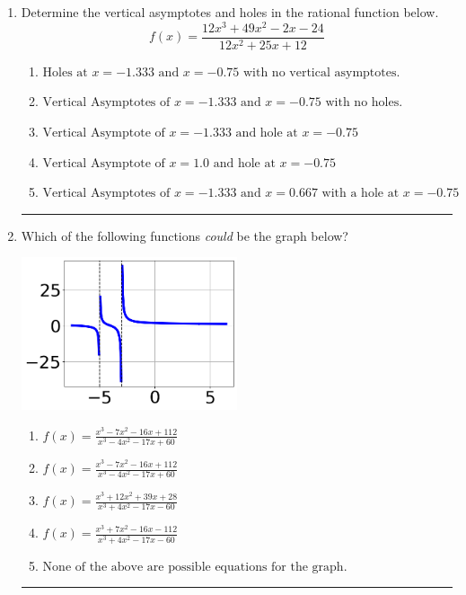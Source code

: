 \documentclass[14pt]{extbook}
\newcommand{\litem}[1]{\item#1\hspace*{-1cm}\rule{\textwidth}{0.4pt}}
\begin{document}
\begin{enumerate}
{\begin{enumerate}[label=\Alph*.]
\end{enumerate} }
\litem{
Determine the vertical asymptotes and holes in the rational function below.\[ f(x) = \frac{12x^{3} +49 x^{2} -2 x -24}{12x^{2} +25 x + 12} \]\begin{enumerate}[label=\Alph*.]
\item \( \text{Holes at } x = -1.333 \text{ and } x = -0.75 \text{ with no vertical asymptotes.} \)
\item \( \text{Vertical Asymptotes of } x = -1.333 \text{ and } x = -0.75 \text{ with no holes.} \)
\item \( \text{Vertical Asymptote of } x = -1.333 \text{ and hole at } x = -0.75 \)
\item \( \text{Vertical Asymptote of } x = 1.0 \text{ and hole at } x = -0.75 \)
\item \( \text{Vertical Asymptotes of } x = -1.333 \text{ and } x = 0.667 \text{ with a hole at } x = -0.75 \)

\end{enumerate} }
\litem{
Which of the following functions \textit{could} be the graph below?
\begin{center}
    \includegraphics[width=0.5\textwidth]{../Figures/identifyGraphOfRationalFunctionCopyB.png}
\end{center}
\begin{enumerate}[label=\Alph*.]
\item \( f(x)=\frac{x^{3} -7 x^{2} -16 x + 112}{x^{3} -4 x^{2} -17 x + 60} \)
\item \( f(x)=\frac{x^{3} -7 x^{2} -16 x + 112}{x^{3} -4 x^{2} -17 x + 60} \)
\item \( f(x)=\frac{x^{3} +12 x^{2} +39 x + 28}{x^{3} +4 x^{2} -17 x -60} \)
\item \( f(x)=\frac{x^{3} +7 x^{2} -16 x -112}{x^{3} +4 x^{2} -17 x -60} \)
\item \( \text{None of the above are possible equations for the graph.} \)


\end{enumerate}}
\end{enumerate}
\end{document}
